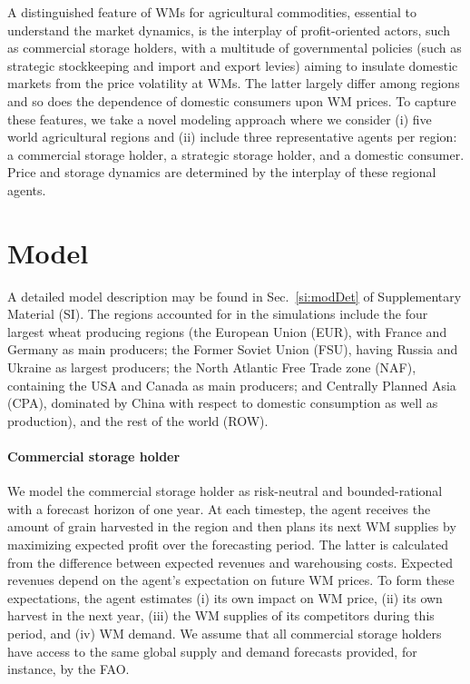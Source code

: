 \documentclass[12pt]{article}
\begin{document}
A distinguished feature of WMs for agricultural commodities, essential to understand the market dynamics, is the interplay of profit-oriented actors, such as commercial storage holders, with a multitude of governmental policies (such as strategic stockkeeping and import and export levies) aiming to insulate domestic markets from the price volatility at WMs. The latter  largely differ among regions and so does the dependence of domestic consumers upon WM prices. To capture these features, we take a novel modeling approach where we consider (i) five world agricultural regions and (ii) include three representative agents per region: a commercial storage holder, a strategic storage holder, and a domestic consumer.
Price and storage dynamics are determined by the interplay of these regional agents.

\section*{Model}
A detailed model description may be found in Sec.~\ref{si:modDet} of Supplementary Material (SI). The regions accounted for in the simulations include the four largest wheat producing regions (the European Union (EUR), with France and Germany as main producers; the Former Soviet Union (FSU), having Russia and Ukraine as largest producers; the North Atlantic Free Trade zone (NAF), containing the USA and Canada as main producers; and Centrally Planned Asia (CPA), dominated by China with respect to domestic consumption as well as production), and the rest of the world (ROW). 

\paragraph*{Commercial storage holder}
We model the commercial storage holder  as risk-neutral and bounded-rational with a forecast horizon of one year. At each timestep, the agent receives the amount of grain harvested in the region and then plans its next WM supplies by maximizing expected profit over the forecasting period. The latter is calculated from the difference between expected revenues and warehousing costs. Expected revenues depend on the agent's expectation on future WM prices. To form these expectations, the agent estimates (i) its own impact on WM price, (ii) its own harvest in the next year, (iii) the WM supplies of its competitors during this period, and (iv) WM demand. We assume that all commercial storage holders have access to the same global supply and demand forecasts provided, for instance, by the FAO.
\end{document}
